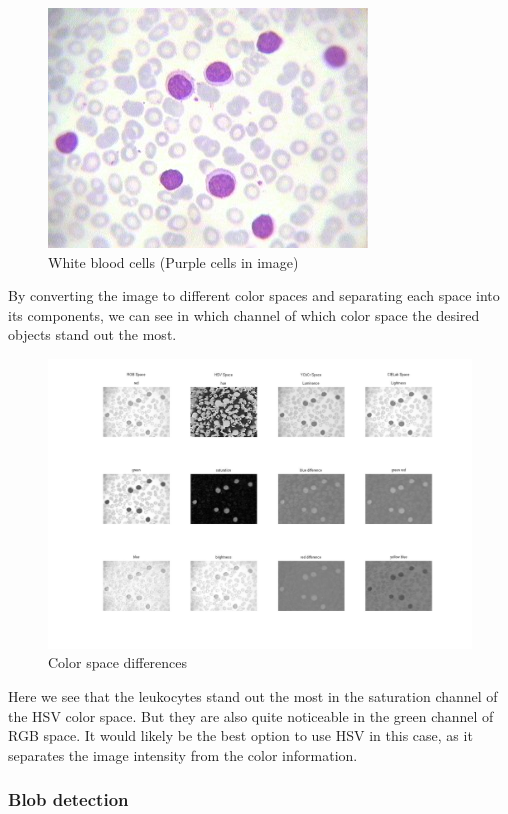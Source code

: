 			\begin{figure}[H]
				\centering
				\includegraphics[width=0.2\linewidth]{figure/Analysis/leukocytes.jpg}
				\caption{White blood cells (Purple cells in image)}
				\label{fig:leukocytes}
			\end{figure}
			
			By converting the image to different color spaces and separating each space into its components, we can see in which channel of which color space the desired objects stand out the most. 
			
					\begin{figure}[H]
				\centering
				\includegraphics[width=\linewidth]{figure/Analysis/differences.jpg}
				\caption{Color space differences}
				\label{fig:differences}
			\end{figure}
		Here we see that the leukocytes stand out the most in the saturation channel of the HSV color space. But they are also quite noticeable in the green channel of RGB space. It would likely be the best option to use HSV in this case, as it separates the image intensity from the color information.
	
			\subsubsection{Blob detection}
			

